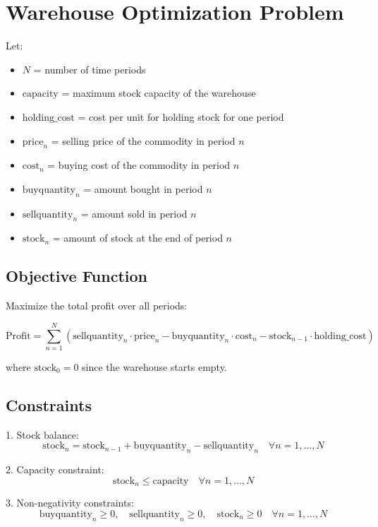 \documentclass{article}
\begin{document}
\section*{Warehouse Optimization Problem}

Let:
\begin{itemize}
    \item \( N \) = number of time periods
    \item \( \text{capacity} \) = maximum stock capacity of the warehouse
    \item \( \text{holding\_cost} \) = cost per unit for holding stock for one period
    \item \( \text{price}_n \) = selling price of the commodity in period \( n \)
    \item \( \text{cost}_n \) = buying cost of the commodity in period \( n \)
    \item \( \text{buyquantity}_n \) = amount bought in period \( n \)
    \item \( \text{sellquantity}_n \) = amount sold in period \( n \)
    \item \( \text{stock}_n \) = amount of stock at the end of period \( n \)
\end{itemize}

\subsection*{Objective Function}

Maximize the total profit over all periods:

\[
\text{Profit} = \sum_{n=1}^{N} \left( \text{sellquantity}_n \cdot \text{price}_n - \text{buyquantity}_n \cdot \text{cost}_n - \text{stock}_{n-1} \cdot \text{holding\_cost} \right)
\]

where \( \text{stock}_0 = 0 \) since the warehouse starts empty.

\subsection*{Constraints}

1. Stock balance:
\[
\text{stock}_n = \text{stock}_{n-1} + \text{buyquantity}_n - \text{sellquantity}_n \quad \forall n = 1, \ldots, N
\]

2. Capacity constraint:
\[
\text{stock}_n \leq \text{capacity} \quad \forall n = 1, \ldots, N
\]

3. Non-negativity constraints:
\[
\text{buyquantity}_n \geq 0, \quad \text{sellquantity}_n \geq 0, \quad \text{stock}_n \geq 0 \quad \forall n = 1, \ldots, N
\]
\end{document}
